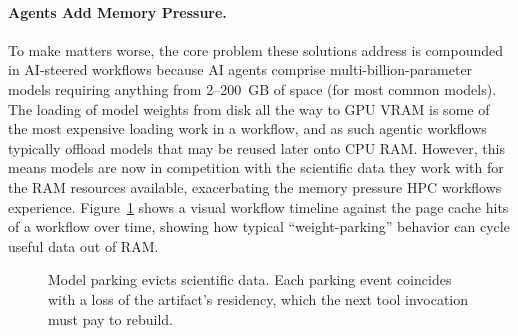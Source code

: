 \paragraph{Agents Add Memory Pressure.}
To make matters worse, the core problem these solutions address is compounded
in AI-steered workflows because AI agents comprise multi-billion-parameter
models requiring anything from 2--200~GB of space (for most common models).
The loading of model weights from disk all the way to GPU VRAM is some of the
most expensive loading work in a workflow, and as such agentic workflows
typically offload models that may be reused later onto CPU RAM. However, this
means models are now in competition with the scientific data they work with
for the RAM resources available, exacerbating the memory pressure HPC
workflows experience. Figure~\ref{fig:replacement-loss} shows a visual
workflow timeline against the page cache hits of a workflow over time, showing
how typical ``weight-parking'' behavior can cycle useful data out of RAM.

\begin{figure}[t]
\centering
{}
\caption{Model parking evicts scientific data. Each parking event coincides
with a loss of the artifact's residency, which the next tool invocation must
pay to rebuild.}
\label{fig:replacement-loss}
\end{figure}

